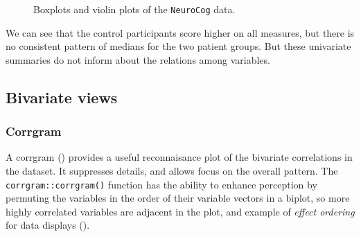 \documentclass[
  letterpaper,
  10pt,
  krantz2]{krantz}
\begin{document}
{\begin{figure}[H]

\caption{\label{fig-NC-boxplot}Boxplots and violin plots of the
\texttt{NeuroCog} data.}

\end{figure}%

We can see that the control participants score higher on all measures,
but there is no consistent pattern of medians for the two patient
groups. But these univariate summaries do not inform about the relations
among variables.

\subsection{Bivariate views}\label{bivariate-views}

\subsubsection*{Corrgram}\label{corrgram}

A corrgram ()
provides a useful reconnaisance plot of the bivariate correlations in
the dataset. It suppresses details, and allows focus on the overall
pattern. The \texttt{corrgram::corrgram()} function has the ability to
enhance perception by permuting the variables in the order of their
variable vectors in a biplot, so more highly correlated variables are
adjacent in the plot, and example of \emph{effect ordering} for data
displays ().

}
\end{document}
